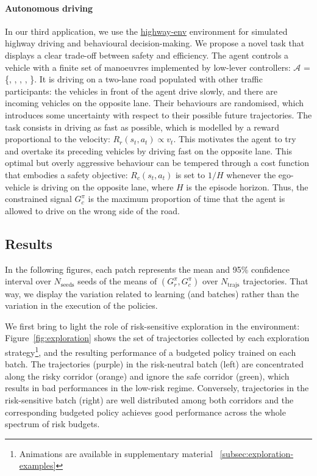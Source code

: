 \documentclass{article}
\begin{document}
\paragraph{Autonomous driving}
In our third application, we use the \href{https://github.com/eleurent/highway-env}{highway-env} environment \citep{Leurent2018} for simulated highway driving and behavioural decision-making.
We propose a novel task that displays a clear trade-off between safety and efficiency. The agent controls a vehicle with a finite set of manoeuvres implemented by low-lever controllers: $\mathcal{A}$ = \{, , , , \}. It is driving on a two-lane road populated with other traffic participants: the vehicles in front of the agent drive slowly, and there are incoming vehicles on the opposite lane. Their behaviours are randomised, which introduces some uncertainty with respect to their possible future trajectories.
The task consists in driving as fast as possible, which is modelled by a reward proportional to the velocity: $R_r(s_t, a_t) \propto v_t$. This motivates the agent to try and overtake its preceding vehicles by driving fast on the opposite lane. This optimal but overly aggressive behaviour can be tempered through a cost function that embodies a safety objective: $R_c(s_t, a_t)$ is set to $1/H$ whenever the ego-vehicle is driving on the opposite lane, where $H$ is the episode horizon. Thus, the constrained signal $G_c^\pi$ is the maximum proportion of time that the agent is allowed to drive on the wrong side of the road.

\subsection{Results}

In the following figures, each patch represents the mean and 95\% confidence interval over $N_{\text{seeds}}$ seeds of the means of $(G_r^\pi,G_c^\pi)$ over $N_\text{trajs}$ trajectories. That way, we display the variation related to learning (and batches) rather than the variation in the execution of the policies.

We first bring to light the role of risk-sensitive exploration in the  environment: Figure~\ref{fig:exploration} shows the set of trajectories collected by each exploration strategy\footnote{Animations are available in supplementary material ~\ref{subsec:exploration-examples}}, and the resulting performance of a budgeted policy trained on each batch. The trajectories (purple) in the risk-neutral batch (left) are concentrated along the risky corridor (orange) and ignore the safe corridor (green), which results in bad performances in the low-risk regime. Conversely, trajectories in the risk-sensitive batch (right) are well distributed among both corridors and the corresponding budgeted policy achieves good performance across the whole spectrum of risk budgets.
\end{document}
